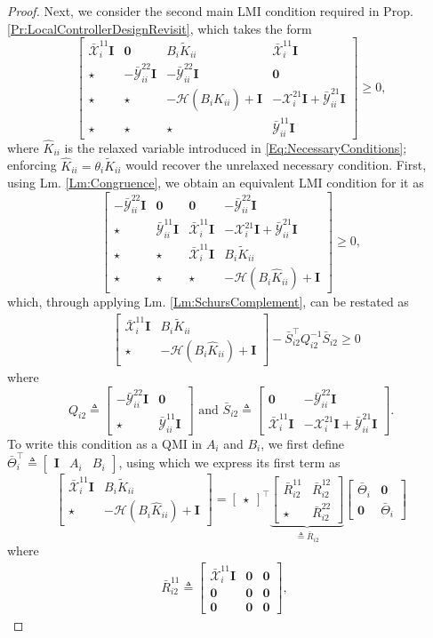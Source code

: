\documentclass[letterpaper, 10 pt, conference]{ieeeconf}%
\newcommand{\T}{\top}
\newcommand{\I}{\mathbf{I}}
\newcommand{\0}{\mathbf{0}}
\newcommand{\X}{\mathcal{X}}
\newcommand{\Y}{\mathcal{Y}}
\newcommand{\x}{{\scriptstyle \X}}
\newcommand{\y}{{\scriptstyle \Y}}
\newcommand{\bm}[1]{\begin{bmatrix}#1\end{bmatrix}}
\begin{document}
\begin{proof}
Next, we consider the second main LMI condition required in Prop. \ref{Pr:LocalControllerDesignRevisit}, which takes the form
$$ 
\bm{
\bar{\x}_i^{11}\I & \0 & B_i \tilde{K}_{ii} & \bar{\x}_i^{11}\I \\
\star & -\bar{\y}^{22}_{ii}\I & -\bar{\y}^{22}_{ii}\I & \0 \\ 
\star& \star & -\mathcal{H}(B_i\hat{K}_{ii})+\I & -\x_i^{21}\I + \bar{\y}^{21}_{ii}\I \\
\star & \star & \star &  \bar{\y}^{11}_{ii}\I 
} \geq 0,
$$
where $\hat{K}_{ii}$ is the relaxed variable introduced in \eqref{Eq:NecessaryConditions}; enforcing 
$\hat{K}_{ii}=\theta_i\tilde K_{ii}$ would recover the unrelaxed necessary condition. 
First, using Lm. \ref{Lm:Congruence}, we obtain an equivalent LMI condition for it as
$$
\bm{
-\bar{\y}^{22}_{ii}\I  & \0 & \0 & -\bar{\y}^{22}_{ii}\I \\ 
\star &  \bar{\y}^{11}_{ii}\I & \bar{\x}_i^{11}\I & -\x_i^{21}\I + \bar{\y}^{21}_{ii}\I \\
\star & \star & \bar{\x}_i^{11}\I & B_i \tilde{K}_{ii} \\
\star & \star & \star& -\mathcal{H}(B_i\hat{K}_{ii})+\I
} \geq 0,
$$
which, through applying Lm. \ref{Lm:SchursComplement}, can be restated as 
\begin{align*}
&\bm{ \bar{\x}_i^{11}\I &  B_i \tilde{K}_{ii} \\ \star & -\mathcal{H}(B_i\hat{K}_{ii})+\I} 
- \bar{S}_{i2}^\T Q_{i2}^{-1} \bar{S}_{i2} \geq 0
\end{align*}
where
$$
Q_{i2} \triangleq 
\bm{
-\bar{\y}^{22}_{ii}\I & \0 \\ 
\star & \bar{\y}^{11}_{ii}\I 
} \mbox{ and }
\bar{S}_{i2} \triangleq \bm{ \0 & -\bar{\y}^{22}_{ii}\I \\ \bar{\x}_i^{11}\I & -\x_i^{21}\I + \bar{\y}^{21}_{ii}\I}.
$$ 
To write this condition as a QMI in $A_i$ and $B_i$, we first define $\bar{\Theta}_i^\T \triangleq \bm{\I & A_i & B_i}$, using which we express its first term as 
$$
\bm{ \bar{\x}_i^{11}\I &  B_i \tilde{K}_{ii} \\ \star & -\mathcal{H}(B_i\hat{K}_{ii})+\I} =
\bm{\star}^\T 
\underbrace{\bm{\bar{R}_{i2}^{11} & \bar{R}_{i2}^{12} \\ \star & \bar{R}_{i2}^{22}}}_{\triangleq \bar{R}_{i2}}
\bm{\bar{\Theta}_i & \0 \\ \0 & \bar{\Theta}_i}
$$
where 
\begin{align*}
\bar{R}_{i2}^{11} \triangleq \bm{ \bar{\x}_i^{11}\I & \0 & \0 \\ \0 & \0 & \0 \\ \0 & \0 & \0}, \quad     

\end{align*}
\end{proof}
\end{document}

